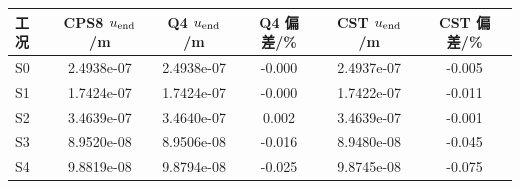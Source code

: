 \begin{tabular}{@{}lS[table-format=1.4e-2]S[table-format=1.4e-2]S[table-format=+1.3]S[table-format=1.4e-2]S[table-format=+1.3]@{}}
\toprule
工况 & {CPS8 $u_{\rm end}$/m} & {Q4 $u_{\rm end}$/m} & {Q4 偏差/\%} & {CST $u_{\rm end}$/m} & {CST 偏差/\%} \\
\midrule
S0 & 2.4938e-07 & 2.4938e-07 & -0.000 & 2.4937e-07 & -0.005 \\
S1 & 1.7424e-07 & 1.7424e-07 & -0.000 & 1.7422e-07 & -0.011 \\
S2 & 3.4639e-07 & 3.4640e-07 & 0.002 & 3.4639e-07 & -0.001 \\
S3 & 8.9520e-08 & 8.9506e-08 & -0.016 & 8.9480e-08 & -0.045 \\
S4 & 9.8819e-08 & 9.8794e-08 & -0.025 & 9.8745e-08 & -0.075 \\
\bottomrule
\end{tabular}
